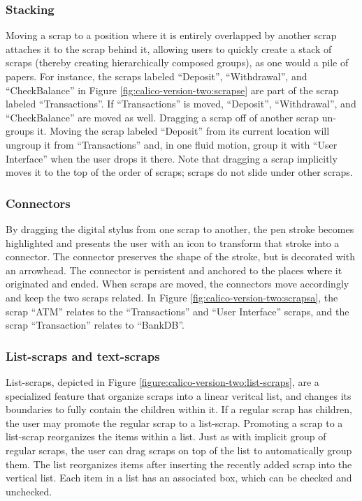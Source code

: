 \subsubsection{Stacking} Moving a scrap to a position where it is entirely overlapped by another scrap attaches it to the scrap behind it, allowing users to quickly create a stack of scraps (thereby creating hierarchically composed groups), as one would a pile of papers. For instance, the scraps labeled ``Deposit'', ``Withdrawal'', and ``CheckBalance'' in Figure \ref{fig:calico-version-two:scrapse} are part of the scrap labeled ``Transactions''. If ``Transactions'' is moved, ``Deposit'', ``Withdrawal'', and ``CheckBalance'' are moved as well. Dragging a scrap off of another scrap un-groups it. Moving the scrap labeled ``Deposit'' from its current location will ungroup it from ``Transactions'' and, in one fluid motion, group it with ``User Interface'' when the user drops it there. Note that dragging a scrap implicitly moves it to the top of the order of scraps; scraps do not slide under other scraps.

\subsubsection{Connectors} By dragging the digital stylus from one scrap to another, the pen stroke becomes highlighted and presents the user with an icon to transform that stroke into a connector. The connector preserves the shape of the stroke, but is decorated with an arrowhead. The connector is persistent and anchored to the places where it originated and ended. When scraps are moved, the connectors move accordingly and keep the two scraps related. In Figure \ref{fig:calico-version-two:scrapsa}, the scrap ``ATM'' relates to the ``Transactions'' and ``User Interface'' scraps, and the scrap ``Transaction'' relates to ``BankDB''.

\subsubsection{List-scraps and text-scraps} List-scraps, depicted in Figure \ref{figure:calico-version-two:list-scraps}, are a specialized feature that organize scraps into a linear veritcal list, and changes its boundaries to fully contain the children within it. If a regular scrap has children, the user may promote the regular scrap to a list-scrap. Promoting a scrap to a list-scrap reorganizes the items within a list. Just as with implicit group of regular scraps, the user can drag scraps on top of the list to automatically group them. The list reorganizes items after inserting the recently added scrap into the vertical list. Each item in a list has an associated box, which can be checked and unchecked.

